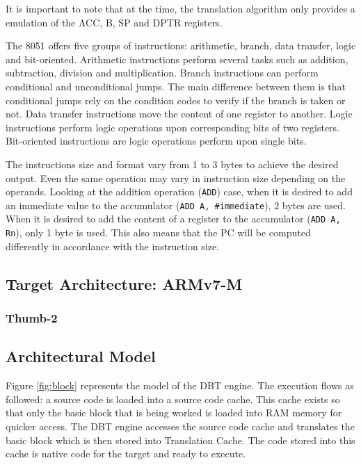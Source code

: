 \documentclass{report}
\begin{document}
		\par It is important to note that at the time, the translation algorithm only provides a emulation of the ACC, B, SP and DPTR registers.
		\par The 8051 offers five groups of instructions: arithmetic, branch, data transfer, logic and bit-oriented. Arithmetic instructions perform several tasks such as addition, subtraction, division and multiplication. Branch instructions can perform conditional and unconditional jumps. The main difference between them is that conditional jumps rely on the condition codes to verify if the branch is taken or not. Data transfer instructions move the content of one register to another. Logic instructions perform logic operations upon corresponding bits of two registers. Bit-oriented instructions are logic operations perform upon single bits\cite{mikroelektronika}.
		\par The instructions size and format vary from 1 to 3 bytes to achieve the desired output. Even the same operation may vary in instruction size depending on the operands. Looking at the addition operation (\texttt{ADD}) case, when it is desired to add an immediate value to the accumulator (\texttt{ADD A, \#immediate}), 2 bytes are used. When it is desired to add the content of a register to the accumulator (\texttt{ADD A, Rn}), only 1 byte is used. This also means that the PC will be computed differently in accordance with the instruction size.
		
		\subsection{Target Architecture: ARMv7-M}
		
		\par 
		
			\subsubsection{Thumb-2}
			
	\subsection{Architectural Model}
	
	\par Figure \ref{fig:block} represents the model of the DBT engine. The execution flows as followed: a source code is loaded into a source code cache. This cache exists so that only the basic block that is being worked is loaded into RAM memory for quicker access. The DBT engine accesses the source code cache and translates the basic block which is then stored into Translation Cache. The code stored into this cache is native code for the target and ready to execute\cite{f.salgadoj.mendesa.tavaresm.ekpanyapong}.
		
\end{document}
